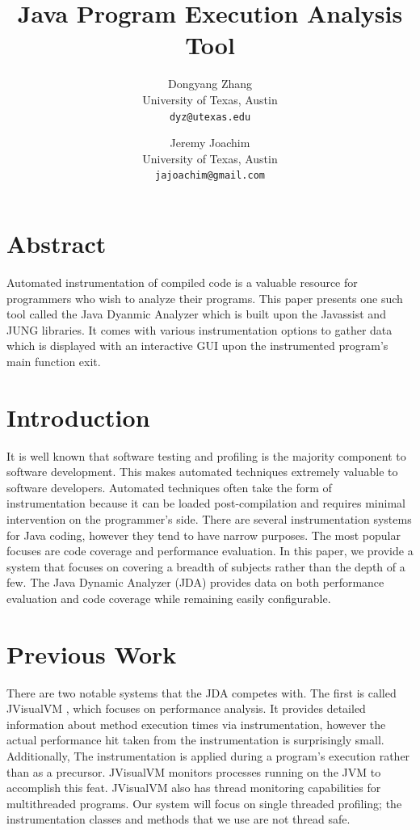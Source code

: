 \documentclass[conference,10pt,twocolumn]{./IEEE/IEEEtran}
\title{Java Program Execution Analysis Tool}
\author{
  Dongyang Zhang \\
  {\fontsize{10}{11}\selectfont University of Texas, Austin}\\ 
  \texttt{dyz@utexas.edu}
\and
  Jeremy Joachim \\
  {\fontsize{10}{11}\selectfont University of Texas, Austin}\\ 
  \texttt{jajoachim@gmail.com}
}
\begin{document}
\maketitle

\section{Abstract}
Automated instrumentation of compiled code is a valuable resource for programmers who wish to analyze their programs.
This paper presents one such tool called the Java Dyanmic Analyzer which is built upon the Javassist and JUNG libraries.
It comes with various instrumentation options to gather data which is displayed with an interactive GUI upon the instrumented program’s main function exit.

\section{Introduction}
It is well known that software testing and profiling is the majority component to software development.
This makes automated techniques extremely valuable to software developers.
Automated techniques often take the form of instrumentation because it can be loaded post-compilation and requires minimal intervention on the programmer’s side.
There are several instrumentation systems for Java coding, however they tend to have narrow purposes.
The most popular focuses are code coverage and performance evaluation.
In this paper, we provide a system that focuses on covering a breadth of subjects rather than the depth of a few. 
The Java Dynamic Analyzer (JDA) provides data on both performance evaluation and code coverage while remaining easily configurable.

\section{Previous Work}
There are two notable systems that the JDA competes with.
The first is called JVisualVM \cite{VisualVM}, which focuses on performance analysis.
It provides detailed information about method execution times via instrumentation, however the actual performance hit taken from the instrumentation is surprisingly small.
Additionally, The instrumentation is applied during a program’s execution rather than as a precursor.
JVisualVM monitors processes running on the JVM to accomplish this feat.
JVisualVM also has thread monitoring capabilities for multithreaded programs.
Our system will focus on single threaded profiling; the instrumentation classes and methods that we use are not thread safe.
\end{document}
